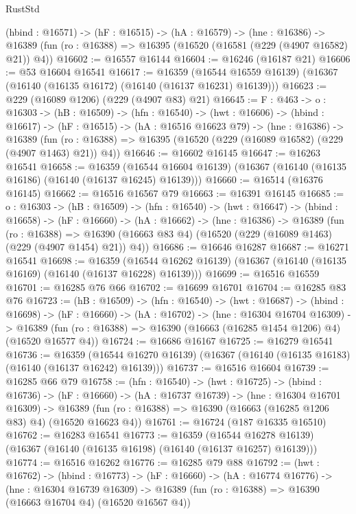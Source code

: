 \begin{lexlean}{RustStd}
\begin{coremodule}
  (hbind : @16571) ->
  (hF : @16515) ->
  (hA : @16579) ->
  (hne : @16386) ->
  @16389 (fun (ro : @16388) => @16395 (@16520 (@16581 (@229 (@4907 @16582) @21)) @4))
@16602 := @16557 @16144
@16604 := @16246 (@16187 @21)
@16606 := @53 @16604 @16541
@16617 := @16359
    (@16544 @16559 @16139)
    (@16367 (@16140 (@16135 @16172) (@16140 (@16137 @16231) @16139)))
@16623 := @229 (@16089 @1206) (@229 (@4907 @83) @21)
@16645 := {F : @463} ->
  {o : @16303} ->
  (hB : @16509) ->
  (hfn : @16540) ->
  (hwt : @16606) ->
  (hbind : @16617) ->
  (hF : @16515) ->
  (hA : @16516 @16623 @79) ->
  (hne : @16386) ->
  @16389 (fun (ro : @16388) => @16395 (@16520 (@229 (@16089 @16582) (@229 (@4907 @1463) @21)) @4))
@16646 := @16602 @16145
@16647 := @16263 @16541
@16658 := @16359
    (@16544 @16604 @16139)
    (@16367 (@16140 (@16135 @16186) (@16140 (@16137 @16245) @16139)))
@16660 := @16514 (@16376 @16145)
@16662 := @16516 @16567 @79
@16663 := @16391 @16145
@16685 := {o : @16303} ->
  (hB : @16509) ->
  (hfn : @16540) ->
  (hwt : @16647) ->
  (hbind : @16658) ->
  (hF : @16660) ->
  (hA : @16662) ->
  (hne : @16386) ->
  @16389
    (fun (ro : @16388) =>
    @16390 (@16663 @83 @4) (@16520 (@229 (@16089 @1463) (@229 (@4907 @1454) @21)) @4))
@16686 := @16646 @16287
@16687 := @16271 @16541
@16698 := @16359
    (@16544 @16262 @16139)
    (@16367 (@16140 (@16135 @16169) (@16140 (@16137 @16228) @16139)))
@16699 := @16516 @16559
@16701 := @16285 @76 @66
@16702 := @16699 @16701
@16704 := @16285 @83 @76
@16723 := (hB : @16509) ->
  (hfn : @16540) ->
  (hwt : @16687) ->
  (hbind : @16698) ->
  (hF : @16660) ->
  (hA : @16702) ->
  (hne : @16304 @16704 @16309) ->
  @16389 (fun (ro : @16388) => @16390 (@16663 (@16285 @1454 @1206) @4) (@16520 @16577 @4))
@16724 := @16686 @16167
@16725 := @16279 @16541
@16736 := @16359
    (@16544 @16270 @16139)
    (@16367 (@16140 (@16135 @16183) (@16140 (@16137 @16242) @16139)))
@16737 := @16516 @16604
@16739 := @16285 @66 @79
@16758 := (hfn : @16540) ->
  (hwt : @16725) ->
  (hbind : @16736) ->
  (hF : @16660) ->
  (hA : @16737 @16739) ->
  (hne : @16304 @16701 @16309) ->
  @16389 (fun (ro : @16388) => @16390 (@16663 (@16285 @1206 @83) @4) (@16520 @16623 @4))
@16761 := @16724 (@187 @16335 @16510)
@16762 := @16283 @16541
@16773 := @16359
    (@16544 @16278 @16139)
    (@16367 (@16140 (@16135 @16198) (@16140 (@16137 @16257) @16139)))
@16774 := @16516 @16262
@16776 := @16285 @79 @88
@16792 := (hwt : @16762) ->
  (hbind : @16773) ->
  (hF : @16660) ->
  (hA : @16774 @16776) ->
  (hne : @16304 @16739 @16309) ->
  @16389 (fun (ro : @16388) => @16390 (@16663 @16704 @4) (@16520 @16567 @4))

\end{coremodule}
\end{lexlean}

